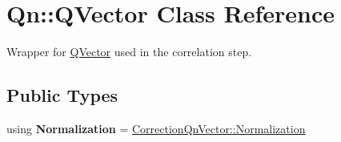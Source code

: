 \hypertarget{classQn_1_1QVector}{}\section{Qn\+:\+:Q\+Vector Class Reference}
\label{classQn_1_1QVector}


Wrapper for \mbox{\hyperlink{classQn_1_1QVector}{Q\+Vector}} used in the correlation step.  


\subsection*{Public Types}
\begin{DoxyCompactItemize}
\item 
\mbox{\label{classQn_1_1QVector_a590c5e56fee3e2a1041c2e3b8521a6b4}} 
using {\bfseries Normalization} = \mbox{\hyperlink{classQn_1_1CorrectionQnVector_a2998fe4babb716c57848c8c73b24a398}{Correction\+Qn\+Vector\+::\+Normalization}}
\end{DoxyCompactItemize}
